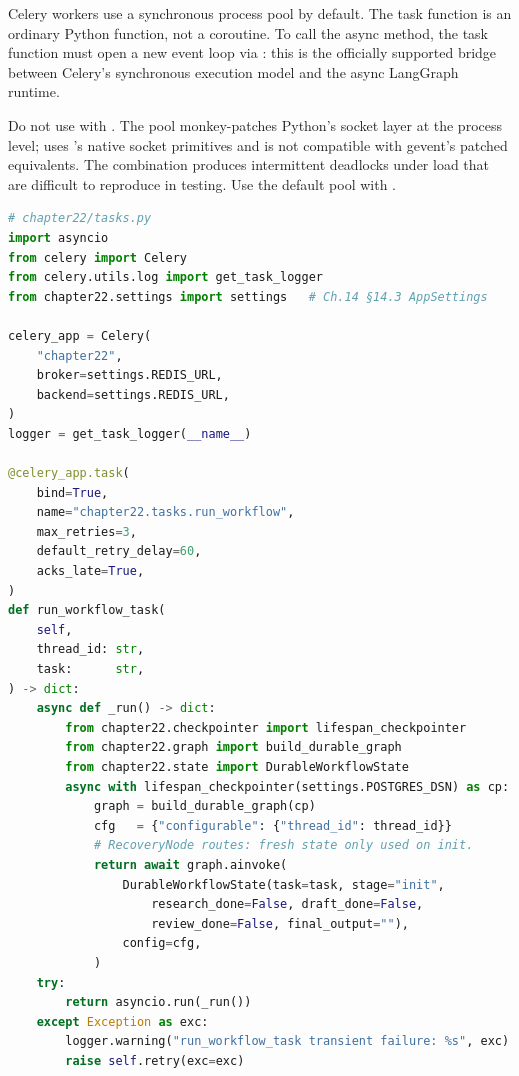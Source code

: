Celery workers use a synchronous  process pool by default.
The task function is an ordinary Python function, not a coroutine. To
call the async  method, the task function must open a new
event loop via : this is the officially supported
bridge between Celery's synchronous execution model and the async
LangGraph runtime.

\begin{warningbox}
Do not use  with . The 
pool monkey-patches Python's socket layer at the process level;
 uses 's native socket primitives and is not
compatible with gevent's patched equivalents. The combination produces
intermittent deadlocks under load that are difficult to reproduce in
testing. Use the default  pool with .
\end{warningbox}

\begin{lstlisting}[language=Python,
  caption={Celery app instantiation, run\_workflow\_task with
           asyncio.run() bridge, self.retry() on transient failure},
  label={lst:durable-celery-task}]
# chapter22/tasks.py
import asyncio
from celery import Celery
from celery.utils.log import get_task_logger
from chapter22.settings import settings   # Ch.14 §14.3 AppSettings

celery_app = Celery(
    "chapter22",
    broker=settings.REDIS_URL,
    backend=settings.REDIS_URL,
)
logger = get_task_logger(__name__)

@celery_app.task(
    bind=True,
    name="chapter22.tasks.run_workflow",
    max_retries=3,
    default_retry_delay=60,
    acks_late=True,
)
def run_workflow_task(
    self,
    thread_id: str,
    task:      str,
) -> dict:
    async def _run() -> dict:
        from chapter22.checkpointer import lifespan_checkpointer
        from chapter22.graph import build_durable_graph
        from chapter22.state import DurableWorkflowState
        async with lifespan_checkpointer(settings.POSTGRES_DSN) as cp:
            graph = build_durable_graph(cp)
            cfg   = {"configurable": {"thread_id": thread_id}}
            # RecoveryNode routes: fresh state only used on init.
            return await graph.ainvoke(
                DurableWorkflowState(task=task, stage="init",
                    research_done=False, draft_done=False,
                    review_done=False, final_output=""),
                config=cfg,
            )
    try:
        return asyncio.run(_run())
    except Exception as exc:
        logger.warning("run_workflow_task transient failure: %s", exc)
        raise self.retry(exc=exc)
\end{lstlisting}

